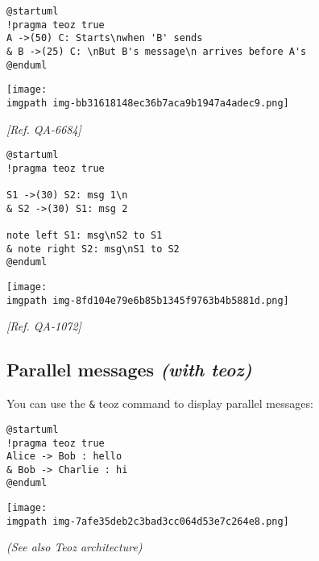 \begin{verbatim}
@startuml
!pragma teoz true
A ->(50) C: Starts\nwhen 'B' sends
& B ->(25) C: \nBut B's message\n arrives before A's
@enduml
\end{verbatim}
\begin{center}
\texttt{[image: \\imgpath img-bb31618148ec36b7aca9b1947a4adec9.png]}
\end{center}
\textit{[Ref. QA-6684]}


\begin{verbatim}
@startuml
!pragma teoz true

S1 ->(30) S2: msg 1\n
& S2 ->(30) S1: msg 2

note left S1: msg\nS2 to S1
& note right S2: msg\nS1 to S2
@enduml
\end{verbatim}
\begin{center}
\texttt{[image: \\imgpath img-8fd104e79e6b85b1345f9763b4b5881d.png]}
\end{center}
\textit{[Ref. QA-1072]}
%
%
\subsection{Parallel messages \textit{(with teoz)}}


You can use the \texttt{\&} teoz command to display parallel messages:


\begin{verbatim}
@startuml
!pragma teoz true
Alice -> Bob : hello
& Bob -> Charlie : hi
@enduml
\end{verbatim}
\begin{center}
\texttt{[image: \\imgpath img-7afe35deb2c3bad3cc064d53e7c264e8.png]}
\end{center}


\textit{(See also Teoz architecture)}
